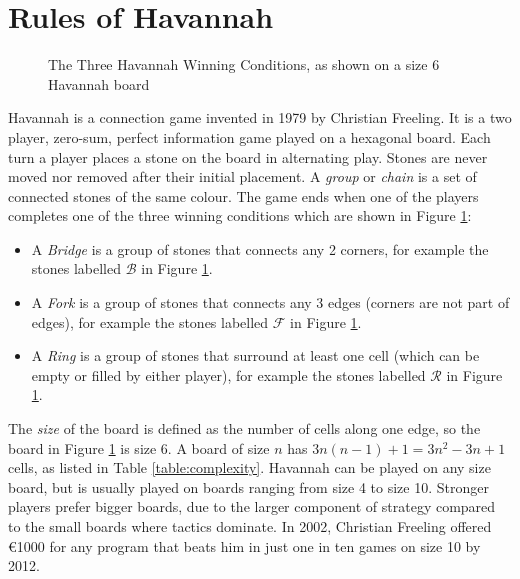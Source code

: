 
\section{Rules of Havannah}


\begin{figure}
\centering
\begin{HavannahBoard}[board size=6,coordinate style=classical]
\end{HavannahBoard}
\caption[The Three Havannah Winning Conditions]{The Three Havannah Winning Conditions, as shown on a size 6 Havannah board}
\label{fig:rules}
\end{figure}

Havannah is a connection game invented in 1979 by Christian Freeling. It is a two player, zero-sum, perfect information game played on a hexagonal board. Each turn a player places a stone on the board in alternating play. Stones are never moved nor removed after their initial placement. A \textit{group} or \textit{chain} is a set of connected stones of the same colour. The game ends when one of the players completes one of the three winning conditions which are shown in Figure \ref{fig:rules}:
\begin{itemize}
	\setlength{\itemsep}{0pt}
	\setlength{\parskip}{0pt}
	\setlength{\parsep}{0pt}
	\item A \textit{Bridge} is a group of stones that connects any 2 corners, for example the stones labelled $\mathcal B$ in Figure \ref{fig:rules}.
	\item A \textit{Fork} is a group of stones that connects any 3 edges (corners are not part of edges), for example the stones labelled $\mathcal F$ in Figure \ref{fig:rules}.
	\item A \textit{Ring} is a group of stones that surround at least one cell (which can be empty or filled by either player), for example the stones labelled $\mathcal R$ in Figure \ref{fig:rules}.
\end{itemize}

The \textit{size} of the board is defined as the number of cells along one edge, so the board in Figure \ref{fig:rules} is size 6. A board of size $n$ has $3n(n-1) + 1 = 3n^2 - 3n + 1$ cells, as listed in Table \ref{table:complexity}. Havannah can be played on any size board, but is usually played on boards ranging from size 4 to size 10. Stronger players prefer bigger boards, due to the larger component of strategy compared to the small boards where tactics dominate. In 2002, Christian Freeling offered \euro 1000 for any program that beats him in just one in ten games on size 10 by 2012.

